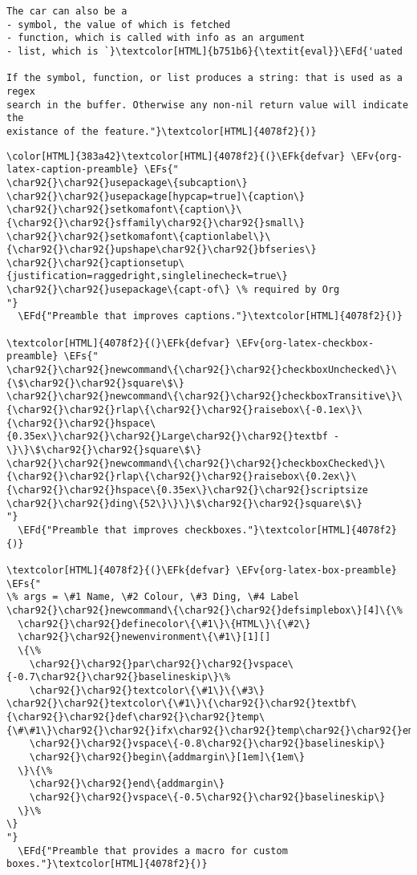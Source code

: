 \documentclass{scrartcl}
\newcommand{\EFk}[1]{\textcolor{EFk}{#1}} %
\newcommand{\EFd}[1]{\textcolor{EFd}{\textit{#1}}} %
\newcommand{\EFs}[1]{\textcolor{EFs}{#1}} %
\newcommand{\EFv}[1]{\textcolor{EFv}{#1}} %
\begin{document}
\begin{enumerate}
\begin{Code}
\begin{Verbatim}[]
The car can also be a
- symbol, the value of which is fetched
- function, which is called with info as an argument
- list, which is `}\textcolor[HTML]{b751b6}{\textit{eval}}\EFd{'uated

If the symbol, function, or list produces a string: that is used as a regex
search in the buffer. Otherwise any non-nil return value will indicate the
existance of the feature."}\textcolor[HTML]{4078f2}{)}
\end{Verbatim}
\end{Code}

\begin{Code}
\begin{Verbatim}[]
\color[HTML]{383a42}\textcolor[HTML]{4078f2}{(}\EFk{defvar} \EFv{org-latex-caption-preamble} \EFs{"
\char92{}\char92{}usepackage\{subcaption\}
\char92{}\char92{}usepackage[hypcap=true]\{caption\}
\char92{}\char92{}setkomafont\{caption\}\{\char92{}\char92{}sffamily\char92{}\char92{}small\}
\char92{}\char92{}setkomafont\{captionlabel\}\{\char92{}\char92{}upshape\char92{}\char92{}bfseries\}
\char92{}\char92{}captionsetup\{justification=raggedright,singlelinecheck=true\}
\char92{}\char92{}usepackage\{capt-of\} \% required by Org
"}
  \EFd{"Preamble that improves captions."}\textcolor[HTML]{4078f2}{)}

\textcolor[HTML]{4078f2}{(}\EFk{defvar} \EFv{org-latex-checkbox-preamble} \EFs{"
\char92{}\char92{}newcommand\{\char92{}\char92{}checkboxUnchecked\}\{\$\char92{}\char92{}square\$\}
\char92{}\char92{}newcommand\{\char92{}\char92{}checkboxTransitive\}\{\char92{}\char92{}rlap\{\char92{}\char92{}raisebox\{-0.1ex\}\{\char92{}\char92{}hspace\{0.35ex\}\char92{}\char92{}Large\char92{}\char92{}textbf -\}\}\$\char92{}\char92{}square\$\}
\char92{}\char92{}newcommand\{\char92{}\char92{}checkboxChecked\}\{\char92{}\char92{}rlap\{\char92{}\char92{}raisebox\{0.2ex\}\{\char92{}\char92{}hspace\{0.35ex\}\char92{}\char92{}scriptsize \char92{}\char92{}ding\{52\}\}\}\$\char92{}\char92{}square\$\}
"}
  \EFd{"Preamble that improves checkboxes."}\textcolor[HTML]{4078f2}{)}

\textcolor[HTML]{4078f2}{(}\EFk{defvar} \EFv{org-latex-box-preamble} \EFs{"
\% args = \#1 Name, \#2 Colour, \#3 Ding, \#4 Label
\char92{}\char92{}newcommand\{\char92{}\char92{}defsimplebox\}[4]\{\%
  \char92{}\char92{}definecolor\{\#1\}\{HTML\}\{\#2\}
  \char92{}\char92{}newenvironment\{\#1\}[1][]
  \{\%
    \char92{}\char92{}par\char92{}\char92{}vspace\{-0.7\char92{}\char92{}baselineskip\}\%
    \char92{}\char92{}textcolor\{\#1\}\{\#3\} \char92{}\char92{}textcolor\{\#1\}\{\char92{}\char92{}textbf\{\char92{}\char92{}def\char92{}\char92{}temp\{\#\#1\}\char92{}\char92{}ifx\char92{}\char92{}temp\char92{}\char92{}empty\#4\char92{}\char92{}else\#\#1\char92{}\char92{}fi\}\}\%
    \char92{}\char92{}vspace\{-0.8\char92{}\char92{}baselineskip\}
    \char92{}\char92{}begin\{addmargin\}[1em]\{1em\}
  \}\{\%
    \char92{}\char92{}end\{addmargin\}
    \char92{}\char92{}vspace\{-0.5\char92{}\char92{}baselineskip\}
  \}\%
\}
"}
  \EFd{"Preamble that provides a macro for custom boxes."}\textcolor[HTML]{4078f2}{)}
\end{Verbatim}
\end{Code}


\end{enumerate}
\end{document}
